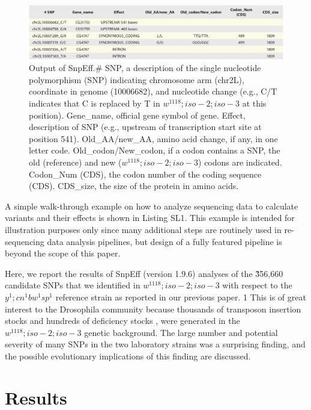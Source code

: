 \begin{figure}
    \centering
    \includegraphics[width=14cm]{snpeff_table1.png}
    \caption{Output of SnpEff.\# SNP, a description of the single nucleotide polymorphism (SNP) indicating chromosome arm (chr2L), coordinate in genome (10006682), and nucleotide change (e.g., C/T indicates that C is replaced by T in $w^{1118} ; iso-2; iso-3$ at this position). Gene\_name, official gene symbol of gene. Effect, description of SNP (e.g., upstream of transcription start site at position 541). Old\_AA/new\_AA, amino acid change, if any, in one letter code. Old\_codon/New\_codon, if a codon contains a SNP, the old (reference) and new ($w^{1118} ; iso-2; iso-3$) codons are indicated. Codon\_Num (CDS), the codon number of the coding sequence (CDS). CDS\_size, the size of the protein in amino acids.}
    \label{fig:snpeffTab1}
\end{figure}

A simple walk-through example on how to analyze sequencing data to calculate variants and their effects is shown in Listing SL1. This example is intended for illustration purposes only since many additional steps are routinely used in re-sequencing data analysis pipelines, but design of a fully featured pipeline is beyond the scope of this paper.

Here, we report the results of SnpEff (version 1.9.6) analyses of the \~356,660 candidate SNPs that we identified in $w^{1118} ; iso-2; iso-3$ with respect to the $y^1 ; cn^1 bw^1 sp^1$ reference strain as reported in our previous paper. 1 This is of great interest to the Drosophila community because thousands of transposon insertion stocks \cite{thibault2004complementary} and hundreds of deficiency stocks \cite{parks2004systematic},\cite{parks2004systematic} were generated in the $w^{1118} ; iso-2; iso-3$ genetic background. The large number and potential severity of many SNPs in the two laboratory strains was a surprising finding, and the possible evolutionary implications of this finding are discussed.

\section{Results}

